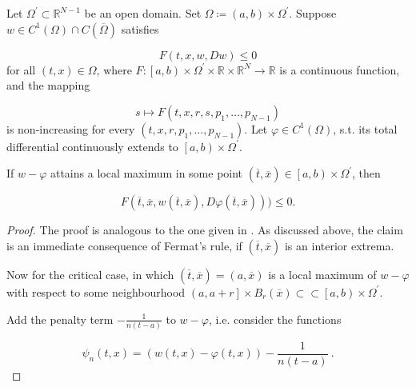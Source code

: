 \begin{lemma}
			\label{extension lemma}
			Let $ \Omega^{\prime} \subset \mathbb{R}^{N-1} $ be an open domain. Set $ \Omega \coloneqq \left( a, b \right) \times \Omega^{\prime} $. Suppose $ w \in C^{1}\left( \Omega \right) \cap C (\overline{\Omega})$ satisfies
			
			\begin{equation*}
				F(t, x, w, Dw) \leq 0
			\end{equation*}
			for all $ (t, x) \in \Omega $, where $ F : \left[ a, b \right) \times \Omega^{\prime} \times \mathbb{R} \times \mathbb{R}^{N} \to \mathbb{R} $ is a continuous function, and the mapping
			
			\begin{equation*}
				 s \mapsto F(t, x, r, s, p_1, \ldots, p_{N-1})
			\end{equation*}
			is non-increasing for every $ (t, x, r, p_1, \ldots, p_{N-1}) $. Let $ \varphi \in C^{1} \left( \Omega \right) $, s.t. its total differential continuously extends to $ \left[a, b\right) \times \Omega^{\prime} $.
			
			If $ w - \varphi $ attains a local maximum in some point $ (\overline{t}, \overline{x}) \in \left[a, b\right) \times \Omega^{\prime} $, then
			
			\begin{equation*}
				F(\overline{t}, \overline{x}, w(\overline{t}, \overline{x}), D\varphi(\overline{t}, \overline{x}))) \leq 0.
			\end{equation*}
			
			\begin{proof}
				The proof is analogous to the one given in \cite[p.~41]{bardi2008optimal}. As discussed above, the claim is an immediate consequence of Fermat's rule, if $ (\overline{t}, \overline{x}) $ is an interior extrema.
				
				Now for the critical case, in which $ (\overline{t}, \overline{x}) = (a, \overline{x}) $ is a local maximum of $ w - \varphi $ with respect to some neighbourhood $ \left( a, a + r \right] \times B_r(\overline{x}) \subset \subset \left[ a, b \right) \times \Omega^{\prime} $. 
				
				Add the penalty term $ - \frac{1}{n(t-a)} $ to $ w - \varphi $, i.e. consider the functions
				
				\begin{equation*}
					\psi_n(t, x) = ( w(t, x) - \varphi(t, x)) - \frac{1}{n(t-a)} \ .
				\end{equation*}
				

\end{proof}
\end{lemma}
